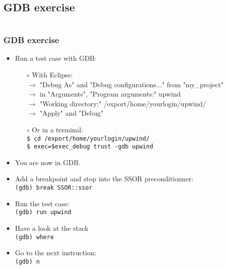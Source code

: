 \documentclass[10pt, hyperref={unicode=true,pdfusetitle, bookmarks=true,bookmarksnumbered=false,bookmarksopen=false, breaklinks=false,pdfborder={0 0 1},backref=true,colorlinks=true,linkcolor=darkblue,pageanchor, urlcolor=darkblue}]{beamer}
\begin{document}
\subsection{{\bf{GDB exercise}}}
\begin{frame}
\begin{columns}[c] 
\tableofcontents[sections={1-3},currentsection, currentsubsection]
\tableofcontents[sections={4-8},currentsection, currentsubsection]
\end{columns}
\end{frame}
\begin{frame}
\frametitle{GDB exercise}
\begin{itemize}
\item Run a test case with GDB:\\
    \begin{itemize}
    \item [$\circ$] With Eclipse:\\
    $\rightarrow$ "Debug As" and "Debug configurations..." from "my\_project"\\
    $\rightarrow$ in "Arguments", "Program arguments:" upwind\\
    $\rightarrow$ "Working directory:"  /export/home/yourlogin/upwind/\\
    $\rightarrow$ "Apply" and "Debug"\\
    \item [$\circ$] Or in a terminal:\\
    \texttt{\$ cd /export/home/yourlogin/upwind/}\\
    \texttt{\$ exec=\$exec\_debug trust -gdb upwind}\\
    \end{itemize}

\item You are now in GDB.

\item Add a breakpoint and stop into the SSOR preconditionner:\\
\texttt{(gdb) break SSOR::ssor}

\item Run the test case:\\
\texttt{(gdb) run upwind}

\item Have a look at the stack\\
\texttt{(gdb) where}\\

\item Go to the next instruction:\\
\texttt{(gdb) n}\\
\end{itemize}
\end{frame}
\end{document}
